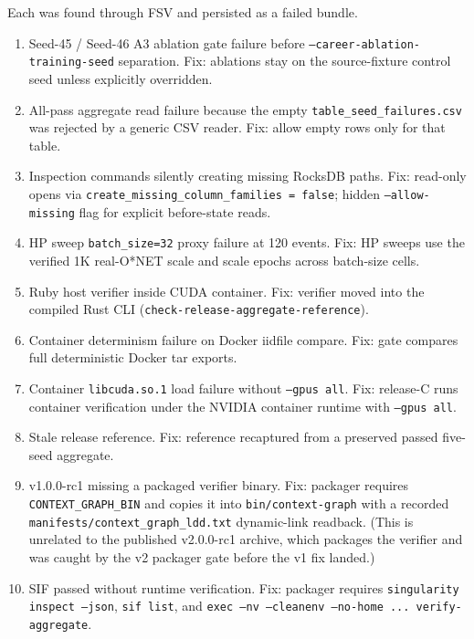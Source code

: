 \documentclass[10pt,twocolumn,letterpaper]{article}
\newcommand{\code}[1]{\texttt{\small #1}}
\begin{document}
Each was found through FSV and persisted as a failed bundle.
\begin{enumerate}[leftmargin=1.2em]
\item Seed-45 / Seed-46 A3 ablation gate failure before
      \code{--career-ablation-training-seed} separation. Fix:
      ablations stay on the source-fixture control seed unless
      explicitly overridden.
\item All-pass aggregate read failure because the empty
      \code{table\_seed\_failures.csv} was rejected by a generic
      CSV reader. Fix: allow empty rows only for that table.
\item Inspection commands silently creating missing RocksDB
      paths. Fix: read-only opens via
      \code{create\_missing\_column\_families = false}; hidden
      \code{--allow-missing} flag for explicit before-state
      reads.
\item HP sweep \code{batch\_size=32} proxy failure at 120 events.
      Fix: HP sweeps use the verified 1K real-O*NET scale and
      scale epochs across batch-size cells.
\item Ruby host verifier inside CUDA container. Fix: verifier
      moved into the compiled Rust CLI
      (\code{check-release-aggregate-reference}).
\item Container determinism failure on Docker iidfile compare.
      Fix: gate compares full deterministic Docker tar exports.
\item Container \code{libcuda.so.1} load failure without
      \code{--gpus all}. Fix: release-C runs container
      verification under the NVIDIA container runtime with
      \code{--gpus all}.
\item Stale release reference. Fix: reference recaptured from a
      preserved passed five-seed aggregate.
\item v1.0.0-rc1 missing a packaged verifier binary. Fix: packager
      requires \code{CONTEXT\_GRAPH\_BIN} and copies it into
      \code{bin/context-graph} with a recorded
      \code{manifests/context\_graph\_ldd.txt} dynamic-link
      readback. (This is unrelated to the published v2.0.0-rc1
      archive, which packages the verifier and was caught by the
      v2 packager gate before the v1 fix landed.)
\item SIF passed without runtime verification. Fix: packager
      requires \code{singularity inspect --json}, \code{sif list},
      and \code{exec --nv --cleanenv --no-home ... verify-aggregate}.
\end{enumerate}
\end{document}
